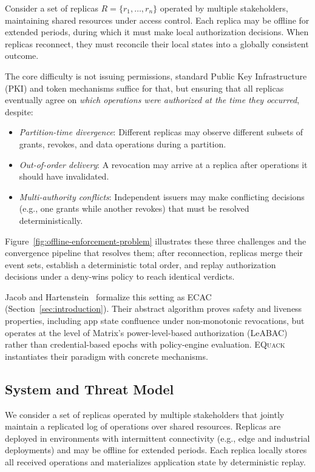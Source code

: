 \documentclass[10pt,journal,compsoc]{IEEEtran}
\newcommand{\equack}{\textsc{EQuack}}
\begin{document}
Consider a set of replicas $R = \{r_1, \ldots, r_n\}$ operated by multiple stakeholders, maintaining shared resources under access control. Each replica may be offline for extended periods, during which it must make local authorization decisions. When replicas reconnect, they must reconcile their local states into a globally consistent outcome.

The core difficulty is not issuing permissions, standard Public Key Infrastructure (PKI) and token mechanisms suffice for that, but ensuring that all replicas eventually agree on \emph{which operations were authorized at the time they occurred}, despite:
\begin{itemize}
    \item \textit{Partition-time divergence}: Different replicas may observe different subsets of grants, revokes, and data operations during a partition.
    \item \textit{Out-of-order delivery}: A revocation may arrive at a replica after operations it should have invalidated.
    \item \textit{Multi-authority conflicts}: Independent issuers may make conflicting decisions (e.g., one grants while another revokes) that must be resolved deterministically.
\end{itemize}

\noindent Figure~\ref{fig:offline-enforcement-problem} illustrates these three challenges and the convergence pipeline that resolves them; after reconnection, replicas merge their event sets, establish a deterministic total order, and replay authorization decisions under a deny-wins policy to reach identical verdicts.

Jacob and Hartenstein~\cite{jacob2024eventuallyac} formalize this setting as ECAC (Section~\ref{sec:introduction}). Their abstract algorithm proves safety and liveness properties, including app state confluence under non-monotonic revocations, but operates at the level of Matrix's power-level-based authorization (LeABAC) rather than credential-based epochs with policy-engine evaluation. \equack{} instantiates their paradigm with concrete mechanisms.

\subsection{System and Threat Model}\label{subsec:system-model}

We consider a set of replicas operated by multiple stakeholders that jointly maintain a replicated log of operations over shared resources. Replicas are deployed in environments with intermittent connectivity (e.g., edge and industrial deployments) and may be offline for extended periods. Each replica locally stores all received operations and materializes application state by deterministic replay.
\end{document}
